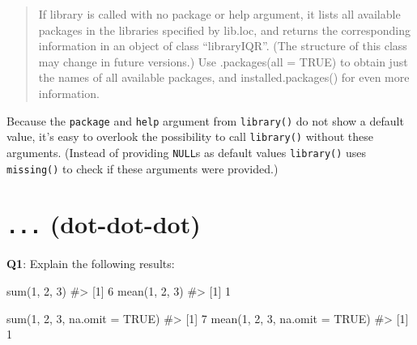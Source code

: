 \documentclass[
]{krantz}
\makeatletter
\newenvironment{Shaded}{\begin{snugshade}}{\end{snugshade}}
\newcommand{\CommentTok}[1]{\textcolor[rgb]{0.56,0.35,0.01}{\textit{#1}}}
\newcommand{\DataTypeTok}[1]{\textcolor[rgb]{0.13,0.29,0.53}{#1}}
\newcommand{\DecValTok}[1]{\textcolor[rgb]{0.00,0.00,0.81}{#1}}
\newcommand{\KeywordTok}[1]{\textcolor[rgb]{0.13,0.29,0.53}{\textbf{#1}}}
\newcommand{\NormalTok}[1]{#1}
\newcommand{\OtherTok}[1]{\textcolor[rgb]{0.56,0.35,0.01}{#1}}
\newenvironment{kframe}{%
\medskip{}
\setlength{\fboxsep}{.8em}
 \def\at@end@of@kframe{}%
 \ifinner\ifhmode%
  \def\at@end@of@kframe{\end{minipage}}%
  \begin{minipage}{\columnwidth}%
 \fi\fi%
 \def\FrameCommand##1{\hskip\@totalleftmargin \hskip-\fboxsep
 \colorbox{shadecolor}{##1}\hskip-\fboxsep
     \hskip-\linewidth \hskip-\@totalleftmargin \hskip\columnwidth}%
 \MakeFramed {\advance\hsize-\width
   \@totalleftmargin\z@ \linewidth\hsize
   \@setminipage}}%
 {\par\unskip\endMakeFramed%
 \at@end@of@kframe}
\renewenvironment{Shaded}{\begin{kframe}}{\end{kframe}}
\renewcommand{\KeywordTok} [1]{\textcolor[rgb]{0.00,0.44,0.13}{{#1}}}
\renewcommand{\DataTypeTok}[1]{\textcolor[rgb]{0.56,0.13,0.00}{{#1}}}
\renewcommand{\DecValTok}  [1]{\textcolor[rgb]{0.25,0.63,0.44}{{#1}}}
\renewcommand{\CommentTok} [1]{\textcolor[rgb]{0.38,0.63,0.69}{{#1}}}
\renewcommand{\OtherTok}   [1]{\textcolor[rgb]{0.00,0.44,0.13}{{#1}}}
\renewcommand{\NormalTok}  [1]{{#1}}
\makeatother
\begin{document}
\begin{quote}
If library is called with no package or help argument, it lists all available packages in the libraries specified by lib.loc, and returns the corresponding information in an object of class ``libraryIQR''. (The structure of this class may change in future versions.) Use .packages(all = TRUE) to obtain just the names of all available packages, and installed.packages() for even more information.
\end{quote}

Because the \texttt{package} and \texttt{help} argument from \texttt{library()} do not show a default value, it's easy to overlook the possibility to call \texttt{library()} without these arguments. (Instead of providing \texttt{NULL}s as default values \texttt{library()} uses \texttt{missing()} to check if these arguments were provided.)

\begin{Shaded}
\end{Shaded}

\hypertarget{dot-dot-dot}{%
\section{\texorpdfstring{\texttt{...} (dot-dot-dot)}{... (dot-dot-dot)}}\label{dot-dot-dot}}

\textbf{{Q1}}: Explain the following results:

\begin{Shaded}
\begin{Highlighting}[]
\KeywordTok{sum}\NormalTok{(}\DecValTok{1}\NormalTok{, }\DecValTok{2}\NormalTok{, }\DecValTok{3}\NormalTok{)}
\CommentTok{#> [1] 6}
\KeywordTok{mean}\NormalTok{(}\DecValTok{1}\NormalTok{, }\DecValTok{2}\NormalTok{, }\DecValTok{3}\NormalTok{)}
\CommentTok{#> [1] 1}

\KeywordTok{sum}\NormalTok{(}\DecValTok{1}\NormalTok{, }\DecValTok{2}\NormalTok{, }\DecValTok{3}\NormalTok{, }\DataTypeTok{na.omit =} \OtherTok{TRUE}\NormalTok{)}
\CommentTok{#> [1] 7}
\KeywordTok{mean}\NormalTok{(}\DecValTok{1}\NormalTok{, }\DecValTok{2}\NormalTok{, }\DecValTok{3}\NormalTok{, }\DataTypeTok{na.omit =} \OtherTok{TRUE}\NormalTok{)}
\CommentTok{#> [1] 1}
\end{Highlighting}
\end{Shaded}
\end{document}
